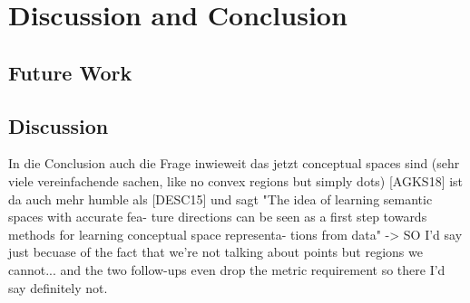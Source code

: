 
\chapter{Discussion and Conclusion}

\section{Future Work}




\section{Discussion}



In die Conclusion auch die Frage inwieweit das jetzt conceptual spaces sind (sehr viele vereinfachende sachen, like no convex regions but simply dots)
[AGKS18] ist da auch mehr humble als [DESC15] und sagt "The idea of learning semantic spaces with accurate fea- ture directions can be seen as a first step towards methods for learning conceptual space representa- tions from data"
-> SO I'd say just becuase of the fact that we're not talking about points but regions we cannot... and the two follow-ups even drop the metric requirement so there I'd say definitely not.
